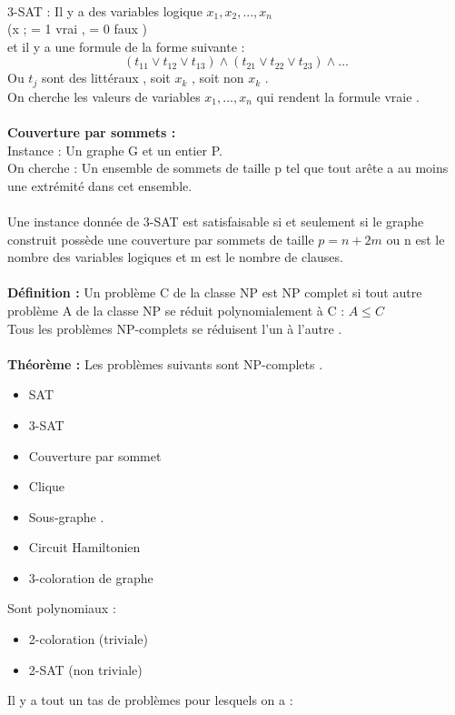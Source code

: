 \documentclass[base.tex]{subfiles}
\begin{document}
\\
3-SAT : Il y a des variables logique $x_1,x_2,...,x_n$ \\
(x ; = 1 vrai  , = 0 faux )\\
et il y a une formule de la forme suivante : \\
\[(t_{11} \vee t_{12}\vee t_{13})\wedge (t_{21} \vee t_{22}\vee t_{23}) \wedge ...\]
Ou $t_j$ sont des littéraux , soit $x_k$ , soit non $x_k$ .\\
On cherche les valeurs de variables $x_1,...,x_n$ qui rendent la formule vraie .\\
\\
\textbf{Couverture par sommets :}\\
Instance : Un graphe G et un entier P.\\
On cherche : Un ensemble de sommets de taille p tel que tout arête a au moins une extrémité dans cet ensemble.\\
\\
Une instance donnée de 3-SAT est satisfaisable si et seulement si le graphe construit possède une couverture par sommets de taille $p=n+2m$ ou n est le nombre des variables logiques et m est le nombre de clauses.\\
\\
\textbf{Définition : }Un problème C de la classe NP est NP complet si tout autre problème A de la classe NP se réduit polynomialement à C : $A\leq C$\\
Tous les problèmes NP-complets se réduisent l'un à l'autre .\\
\\
\textbf{Théorème : }Les problèmes suivants sont NP-complets .
\begin{itemize}
\item SAT
\item 3-SAT
\item Couverture par sommet
\item Clique
\item Sous-graphe .
\item Circuit Hamiltonien
\item 3-coloration de graphe
  \end{itemize}
Sont polynomiaux :
\begin{itemize}
\item 2-coloration (triviale)
  \item 2-SAT (non triviale)
\end{itemize}
Il y a tout un tas de problèmes pour lesquels on a :
\end{document}
